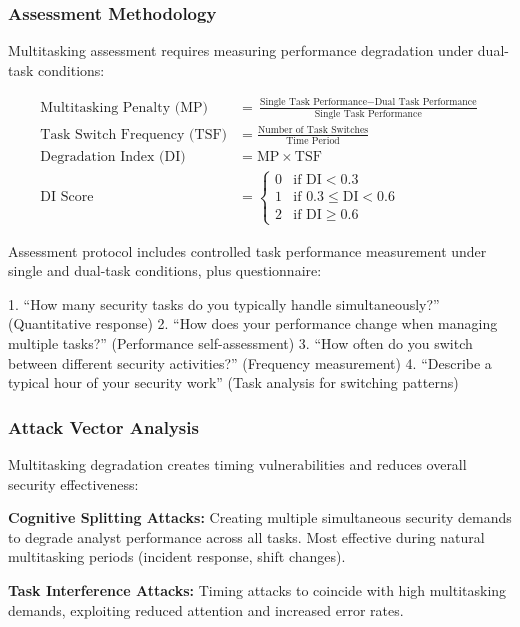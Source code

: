 \documentclass[11pt,a4paper]{article}
\begin{document}
\subsubsection{Assessment Methodology}

Multitasking assessment requires measuring performance degradation under dual-task conditions:

\begin{align}
\text{Multitasking Penalty (MP)} &= \frac{\text{Single Task Performance} - \text{Dual Task Performance}}{\text{Single Task Performance}} \\
\text{Task Switch Frequency (TSF)} &= \frac{\text{Number of Task Switches}}{\text{Time Period}} \\
\text{Degradation Index (DI)} &= \text{MP} \times \text{TSF} \\
\text{DI Score} &= \begin{cases}
0 & \text{if DI} < 0.3 \\
1 & \text{if } 0.3 \leq \text{DI} < 0.6 \\
2 & \text{if DI} \geq 0.6
\end{cases}
\end{align}

Assessment protocol includes controlled task performance measurement under single and dual-task conditions, plus questionnaire:

1. ``How many security tasks do you typically handle simultaneously?'' (Quantitative response)
2. ``How does your performance change when managing multiple tasks?'' (Performance self-assessment)
3. ``How often do you switch between different security activities?'' (Frequency measurement)
4. ``Describe a typical hour of your security work'' (Task analysis for switching patterns)

\subsubsection{Attack Vector Analysis}

Multitasking degradation creates timing vulnerabilities and reduces overall security effectiveness:

\textbf{Cognitive Splitting Attacks:} Creating multiple simultaneous security demands to degrade analyst performance across all tasks. Most effective during natural multitasking periods (incident response, shift changes).

\textbf{Task Interference Attacks:} Timing attacks to coincide with high multitasking demands, exploiting reduced attention and increased error rates.
\end{document}
